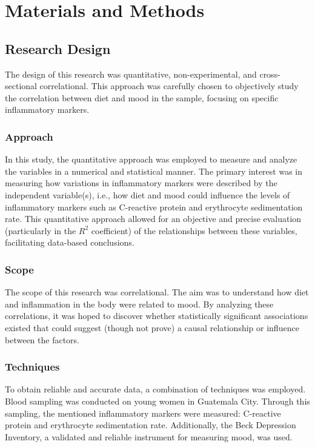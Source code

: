 \documentclass[jou]{apa7}
\begin{document}
\section{Materials and Methods}\label{materiales-y-muxe9todos}

\subsection{Research Design}\label{diseuxf1o-investigaciuxf3n}

The design of this research was quantitative, non-experimental, and cross-sectional correlational. This approach was carefully chosen to objectively study the correlation between diet and mood in the sample, focusing on specific inflammatory markers.\\

\subsubsection{Approach}
In this study, the quantitative approach was employed to measure and analyze the variables in a numerical and statistical manner. The primary interest was in measuring how variations in inflammatory markers were described by the independent variable(s), i.e., how diet and mood could influence the levels of inflammatory markers such as C-reactive protein and erythrocyte sedimentation rate. This quantitative approach allowed for an objective and precise evaluation (particularly in the $R^2$ coefficient) of the relationships between these variables, facilitating data-based conclusions.\\

\subsubsection{Scope}
The scope of this research was correlational.
The aim was to understand how diet and inflammation in the body were related to mood. By analyzing these correlations, it was hoped to discover whether statistically significant associations existed that could suggest (though not prove) a causal relationship or influence between the factors.

\subsubsection{Techniques}
To obtain reliable and accurate data, a combination of techniques was employed. Blood sampling was conducted on young women in Guatemala City. Through this sampling, the mentioned inflammatory markers were measured: C-reactive protein and erythrocyte sedimentation rate. Additionally, the Beck Depression Inventory, a validated and reliable instrument for measuring mood, was used.
\end{document}

